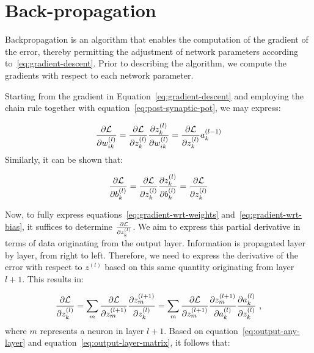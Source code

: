 \section{Back-propagation}\label{sec:backprop}

Backpropagation is an algorithm that enables the computation of the gradient of the error, thereby permitting the adjustment of network parameters according to~\eqref{eq:gradient-descent}. Prior to describing the algorithm, we compute the gradients with respect to each network parameter.

Starting from the gradient in Equation~\eqref{eq:gradient-descent} and employing the chain rule together with equation~\eqref{eq:post-synaptic-pot}, we may express:

\begin{equation}
\label{eq:gradient-wrt-weights}
\frac{\partial \mathcal{L}}{\partial w_{ik}^{(l)}} = \frac{\partial \mathcal{L}}{\partial z_{k}^{(l)}}\frac{\partial z_{k}^{(l)}}{\partial w_{ik}^{(l)}} = \frac{\partial \mathcal{L}}{\partial z_{k}^{(l)}} a_{k}^{(l-1)}
\end{equation}
Similarly, it can be shown that:

\begin{equation}
\label{eq:gradient-wrt-bias}
\frac{\partial \mathcal{L}}{\partial b_{k}^{(l)}} = \frac{\partial \mathcal{L}}{\partial z_{k}^{(l)}}\frac{\partial z_{k}^{(l)}}{\partial b_{k}^{(l)}} = \frac{\partial \mathcal{L}}{\partial z_{k}^{(l)}}
\end{equation}

Now, to fully express equations~\eqref{eq:gradient-wrt-weights} and~\eqref{eq:gradient-wrt-bias}, it suffices to determine $\frac{\partial \mathcal{L}}{\partial z_{k}^{(l)}}$. We aim to express this partial derivative in terms of data originating from the output layer. Information is propagated layer by layer, from right to left. Therefore, we need to express the derivative of the error with respect to $z^{(l)}$ based on this same quantity originating from layer $l+1$. This results in:

\begin{equation}
\label{eq:gradient-wrt-z}
\frac{\partial \mathcal{L}}{\partial z_{k}^{(l)}} = \sum_{m} \frac{\partial \mathcal{L}}{\partial z_{m}^{(l+1)}}\frac{\partial z_{m}^{(l+1)}}{\partial z_{k}^{(l)}} = \sum_{m} \frac{\partial \mathcal{L}}{\partial z_{m}^{(l+1)}}\frac{\partial z_{m}^{(l+1)}}{\partial a_{k}^{(l)}}\frac{\partial a_{k}^{(l)}}{\partial z_{k}^{(l)}}\text{ ,}
\end{equation}
where $m$ represents a neuron in layer $l+1$. Based on equation~\eqref{eq:output-any-layer} and equation~\eqref{eq:output-layer-matrix}, it follows that:

